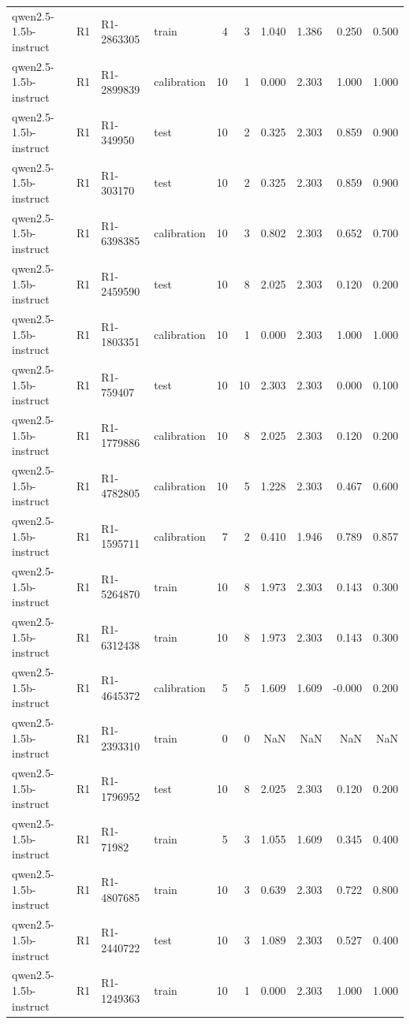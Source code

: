 \begin{table}
\begin{tabular}{llllrrrrrr}
qwen2.5-1.5b-instruct & R1 & R1-2863305 & train & 4 & 3 & 1.040 & 1.386 & 0.250 & 0.500 \\
qwen2.5-1.5b-instruct & R1 & R1-2899839 & calibration & 10 & 1 & 0.000 & 2.303 & 1.000 & 1.000 \\
qwen2.5-1.5b-instruct & R1 & R1-349950 & test & 10 & 2 & 0.325 & 2.303 & 0.859 & 0.900 \\
qwen2.5-1.5b-instruct & R1 & R1-303170 & test & 10 & 2 & 0.325 & 2.303 & 0.859 & 0.900 \\
qwen2.5-1.5b-instruct & R1 & R1-6398385 & calibration & 10 & 3 & 0.802 & 2.303 & 0.652 & 0.700 \\
qwen2.5-1.5b-instruct & R1 & R1-2459590 & test & 10 & 8 & 2.025 & 2.303 & 0.120 & 0.200 \\
qwen2.5-1.5b-instruct & R1 & R1-1803351 & calibration & 10 & 1 & 0.000 & 2.303 & 1.000 & 1.000 \\
qwen2.5-1.5b-instruct & R1 & R1-759407 & test & 10 & 10 & 2.303 & 2.303 & 0.000 & 0.100 \\
qwen2.5-1.5b-instruct & R1 & R1-1779886 & calibration & 10 & 8 & 2.025 & 2.303 & 0.120 & 0.200 \\
qwen2.5-1.5b-instruct & R1 & R1-4782805 & calibration & 10 & 5 & 1.228 & 2.303 & 0.467 & 0.600 \\
qwen2.5-1.5b-instruct & R1 & R1-1595711 & calibration & 7 & 2 & 0.410 & 1.946 & 0.789 & 0.857 \\
qwen2.5-1.5b-instruct & R1 & R1-5264870 & train & 10 & 8 & 1.973 & 2.303 & 0.143 & 0.300 \\
qwen2.5-1.5b-instruct & R1 & R1-6312438 & train & 10 & 8 & 1.973 & 2.303 & 0.143 & 0.300 \\
qwen2.5-1.5b-instruct & R1 & R1-4645372 & calibration & 5 & 5 & 1.609 & 1.609 & -0.000 & 0.200 \\
qwen2.5-1.5b-instruct & R1 & R1-2393310 & train & 0 & 0 & NaN & NaN & NaN & NaN \\
qwen2.5-1.5b-instruct & R1 & R1-1796952 & test & 10 & 8 & 2.025 & 2.303 & 0.120 & 0.200 \\
qwen2.5-1.5b-instruct & R1 & R1-71982 & train & 5 & 3 & 1.055 & 1.609 & 0.345 & 0.400 \\
qwen2.5-1.5b-instruct & R1 & R1-4807685 & train & 10 & 3 & 0.639 & 2.303 & 0.722 & 0.800 \\
qwen2.5-1.5b-instruct & R1 & R1-2440722 & test & 10 & 3 & 1.089 & 2.303 & 0.527 & 0.400 \\
qwen2.5-1.5b-instruct & R1 & R1-1249363 & train & 10 & 1 & 0.000 & 2.303 & 1.000 & 1.000 \\

\end{tabular}
\end{table}

